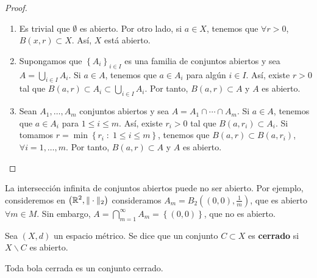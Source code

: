 \begin{proof}
\begin{enumerate}
\item Es trivial que $\displaystyle \emptyset $ es abierto. Por otro lado, si $\displaystyle a \in X $, tenemos que $\displaystyle \forall r > 0 $, $\displaystyle B\left(x,r\right) \subset X $. Así, $\displaystyle X $ está abierto.
\item Supongamos que $\displaystyle \left\{ A_{i}\right\}_{i \in I} $ es una familia de conjuntos abiertos y sea $\displaystyle A = \bigcup_{i \in I}A_{i} $. Si $\displaystyle a \in A $, tenemos que $\displaystyle a \in A_{i} $ para algún $\displaystyle i \in I $. Así, existe $\displaystyle r>0 $ tal que $\displaystyle B \left(a,r\right) \subset A_{i} \subset \bigcup_{i \in I}A_{i}$. Por tanto, $\displaystyle B\left(a,r\right) \subset A $ y $\displaystyle A $ es abierto.
\item Sean $\displaystyle A_{1}, \ldots, A_{m} $ conjuntos abiertos y sea $\displaystyle A = A_{1} \cap \cdots \cap A_{m} $. Si $\displaystyle a \in A $, tenemos que $\displaystyle a \in A_{i} $ para $\displaystyle 1 \leq i \leq m $.
	Así, existe $\displaystyle r_{i} > 0 $ tal que $\displaystyle B\left(a, r_{i}\right) \subset A_{i} $. Si tomamos $\displaystyle r = \min \left\{ r_{i} \; : \; 1 \leq i \leq m\right\}  $, tenemos que $\displaystyle B\left(a, r\right) \subset B\left(a, r_{i}\right) $, $\displaystyle \forall i = 1, \ldots, m $. Por tanto, $\displaystyle B\left(a,r\right) \subset A $ y $\displaystyle A $ es abierto.
\end{enumerate}
\end{proof}
\begin{observation}
La intersección infinita de conjuntos abiertos puede no ser abierto. Por ejemplo, consideremos en $\displaystyle \left(\mathbb{R}^{2}, \| \cdot \|_{2}\right) $ consideramos $\displaystyle A_{m} = B_{2}\left(\left(0,0\right), \frac{1}{m}\right) $, que es abierto $\displaystyle \forall m \in M $.
Sin embargo, $\displaystyle A = \bigcap_{m = 1}^{\infty}A_{m} = \left\{ \left(0,0\right)\right\}  $, que no es abierto.
\end{observation}
\begin{definition}
Sea $\displaystyle \left(X,d\right) $ un espacio métrico. Se dice que un conjunto $\displaystyle C \subset X $ es \textbf{cerrado} si $\displaystyle X\backslash C $ es abierto.
\end{definition}
\begin{prop}
Toda bola cerrada es un conjunto cerrado.
\end{prop}
